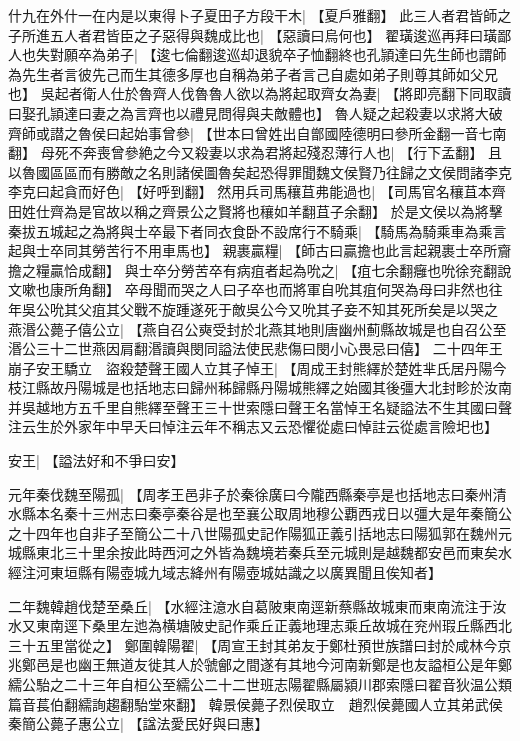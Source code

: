 什九在外什一在内是以東得卜子夏田子方段干木|{
	【夏戶雅翻】}
此三人者君皆師之子所進五人者君皆臣之子惡得與魏成比也|{
	【惡讀曰烏何也】}
翟璜逡巡再拜曰璜鄙人也失對願卒為弟子|{
	【逡七倫翻逡巡却退貌卒子恤翻終也孔頴達曰先生師也謂師為先生者言彼先己而生其德多厚也自稱為弟子者言己自處如弟子則尊其師如父兄也】}
吳起者衛人仕於魯齊人伐魯魯人欲以為將起取齊女為妻|{
	【將即亮翻下同取讀曰娶孔頴達曰妻之為言齊也以禮見問得與夫敵體也】}
魯人疑之起殺妻以求將大破齊師或譛之魯侯曰起始事曾參|{
	【世本曰曾姓出自鄫國陸德明曰參所金翻一音七南翻】}
母死不奔喪曾參絶之今又殺妻以求為君將起殘忍薄行人也|{
	【行下孟翻】}
且以魯國區區而有勝敵之名則諸侯圖魯矣起恐得罪聞魏文侯賢乃往歸之文侯問諸李克李克曰起貪而好色|{
	【好呼到翻】}
然用兵司馬穰苴弗能過也|{
	【司馬官名穰苴本齊田姓仕齊為是官故以稱之齊景公之賢將也穰如羊翻苴子余翻】}
於是文侯以為將擊秦拔五城起之為將與士卒最下者同衣食卧不設席行不騎乘|{
	【騎馬為騎乘車為乘言起與士卒同其勞苦行不用車馬也】}
親裹贏糧|{
	【師古曰贏擔也此言起親裹士卒所齎擔之糧贏恰成翻】}
與士卒分勞苦卒有病疽者起為吮之|{
	【疽七余翻癰也吮徐兖翻說文嗽也康所角翻】}
卒母聞而哭之人曰子卒也而將軍自吮其疽何哭為母曰非然也往年吳公吮其父疽其父戰不旋踵遂死于敵吳公今又吮其子妾不知其死所矣是以哭之　燕湣公薨子僖公立|{
	【燕自召公奭受封於北燕其地則唐幽州薊縣故城是也自召公至湣公三十二世燕因肩翻湣讀與閔同謚法使民悲傷曰閔小心畏忌曰僖】}
二十四年王崩子安王驕立　盜殺楚聲王國人立其子悼王|{
	【周成王封熊繹於楚姓芈氏居丹陽今枝江縣故丹陽城是也括地志曰歸州秭歸縣丹陽城熊繹之始國其後彊大北封畛於汝南并吳越地方五千里自熊繹至聲王三十世索隱曰聲王名當悼王名疑謚法不生其國曰聲注云生於外家年中早夭曰悼注云年不稱志又云恐懼從處曰悼註云從處言險圯也】}
\par
安王|{
	【謚法好和不爭曰安】}
\par
元年秦伐魏至陽孤|{
	【周孝王邑非子於秦徐廣曰今隴西縣秦亭是也括地志曰秦州清水縣本名秦十三州志曰秦亭秦谷是也至襄公取周地穆公覇西戎日以彊大是年秦簡公之十四年也自非子至簡公二十八世陽孤史記作陽狐正義引括地志曰陽狐郭在魏州元城縣東北三十里余按此時西河之外皆為魏境若秦兵至元城則是越魏都安邑而東矣水經注河東垣縣有陽壺城九域志絳州有陽壺城姑識之以廣異聞且俟知者】}
\par
二年魏韓趙伐楚至桑丘|{
	【水經注澺水自葛陂東南逕新蔡縣故城東而東南流注于汝水又東南逕下桑里左迆為横塘陂史記作乘丘正義地理志乘丘故城在兖州瑕丘縣西北三十五里當從之】}
鄭圍韓陽翟|{
	【周宣王封其弟友于鄭杜預世族譜曰封於咸林今京兆鄭邑是也幽王無道友徙其人於虢鄶之間遂有其地今河南新鄭是也友謚桓公是年鄭繻公駘之二十三年自桓公至繻公二十二世班志陽翟縣屬潁川郡索隱曰翟音狄温公類篇音萇伯翻繻詢趨翻駘堂來翻】}
韓景侯薨子烈侯取立　趙烈侯薨國人立其弟武侯　秦簡公薨子惠公立|{
	【諡法愛民好與曰惠】}
